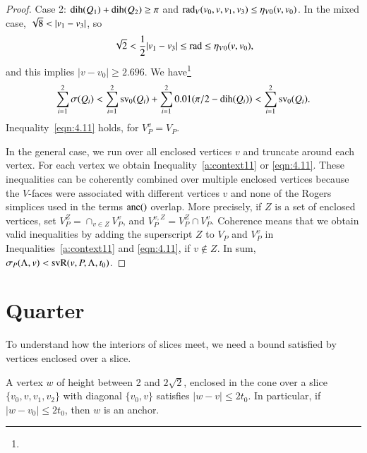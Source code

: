 \begin{proof}
\noindent Case 2:  $\operatorname{dih}(Q_1)+\operatorname{dih}(Q_2)\ge\pi$ and
    $\operatorname{rad}_V(v_0,v,v_1,v_3)\le \eta_{V0}(v,v_0)$.
 In the mixed case,
$\sqr8<|v_1-v_3|$, so
$$\sqrt2<{\frac{1}{2}}|v_1-v_3|\le\operatorname{rad} \le \eta_{V0}(v,v_0),$$
and this implies $|v-v_0|\ge 2.696$. We
have\footnote{}
$$\sum_{i=1}^2 \sigma(Q_i) < \sum_{i=1}^2 {\operatorname{sv}}_0(Q_i) +
\sum_{i=1}^2 0.01(\pi/2-\operatorname{dih}(Q_i))< \sum_{i=1}^2 {\operatorname{sv}}_0(Q_i).$$
Inequality~\ref{eqn:4.11} holds, for $V_P^v=V_P$.

In the general case, we run over all enclosed vertices $v$ and
truncate around each vertex.  For each vertex we obtain
Inequality~\ref{a:context11} or \ref{eqn:4.11}. These inequalities can
be coherently combined over multiple enclosed vertices because the
$V$-faces were associated with different vertices $v$ and none of
the Rogers simplices used in the terms $\operatorname{anc}()$ overlap. More
precisely, if $Z$ is a set of enclosed vertices, set $V_P^Z =
\cap_{v\in Z} V_P^v$, and $V_P^{v,Z} = V_P^Z\cap V_P^v$. Coherence
means that we obtain valid inequalities by adding the superscript
$Z$ to $V_P$ and $V_P^v$ in Inequalities~\ref{a:context11} and
\ref{eqn:4.11}, if $v\not\in Z$. In sum,
    $\sigma_P(\Lambda,v) < {\operatorname{svR}}(v,P,\Lambda,t_0)$.
%
\end{proof}



\section{Quarter} %
    \label{sec:upright}









To understand how the interiors of slices meet, we
need a bound satisfied by vertices enclosed over a slice.


\begin{lemma}
    \label{lemma:anc-simplex-not-enc}
A vertex $w$ of height between 2 and $2\sqrt{2}$, enclosed in the cone
over a slice $\{v_0,v,v_1,v_2\}$ with diagonal $\{v_0,v\}$ satisfies
$|w-v|\le 2t_0$. In particular, if $|w-v_0|\le 2t_0$, then $w$ is an anchor.
\end{lemma}

